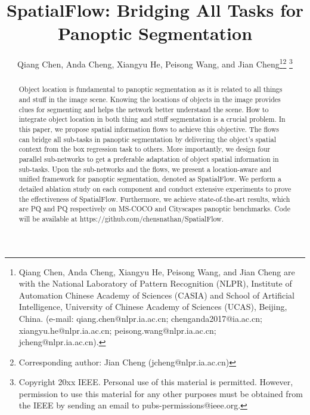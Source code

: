 \documentclass[journal,final]{IEEEtran}
\begin{document}
\title{SpatialFlow: Bridging All Tasks for Panoptic Segmentation}


\author{Qiang Chen,
        Anda Cheng,
        Xiangyu He,
        Peisong Wang,
        and Jian Cheng\thanks{Qiang Chen, Anda Cheng, Xiangyu He, Peisong Wang,  and Jian Cheng are with the National
Laboratory of Pattern Recognition (NLPR), Institute of Automation Chinese Academy
of Sciences (CASIA) and School of Artificial Intelligence, University of Chinese Academy of Sciences (UCAS), Beijing, China. (e-mail: qiang.chen@nlpr.ia.ac.cn; chenganda2017@ia.ac.cn; xiangyu.he@nlpr.ia.ac.cn; peisong.wang@nlpr.ia.ac.cn; 
jcheng@nlpr.ia.ac.cn).}\thanks{Corresponding author: Jian Cheng (jcheng@nlpr.ia.ac.cn)}
\thanks{Copyright \text{\textcopyright} 20xx IEEE. Personal use of this material is permitted. However, permission to use this material for any other purposes must be obtained from the IEEE by sending an email to pubs-permissions@ieee.org.}}




















\maketitle

\begin{abstract}
Object location is fundamental to panoptic segmentation as it is related to all things and stuff in the image scene. Knowing the locations of objects in the image provides clues for segmenting and helps the network better understand the scene. How to integrate object location in both thing and stuff segmentation is a crucial problem. In this paper, we propose spatial information flows to achieve this objective. The flows can bridge all sub-tasks in panoptic segmentation by delivering the object's spatial context from the box regression task to others. More importantly, we design four parallel sub-networks to get a preferable adaptation of object spatial information in sub-tasks. Upon the sub-networks and the flows, we present a location-aware and unified framework for panoptic segmentation, denoted as SpatialFlow. We perform a detailed ablation study on each component and conduct extensive experiments to prove the effectiveness of SpatialFlow. Furthermore, we achieve state-of-the-art results, which are  PQ and  PQ respectively on MS-COCO and Cityscapes panoptic benchmarks. Code will be available at https://github.com/chensnathan/SpatialFlow.\end{abstract}
\end{document}
